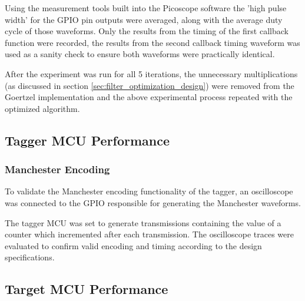 Using the measurement tools built into the Picoscope software the 'high pulse width' for the GPIO pin outputs were averaged, along with the average duty cycle of those waveforms. Only the results from the timing of the first callback function were recorded, the results from the second callback timing waveform was used as a sanity check to ensure both waveforms were practically identical.


After the experiment was run for all 5 iterations, the unnecessary multiplications (as discussed in section \ref{sec:filter_optimization_design}) were removed from the Goertzel implementation and the above experimental process repeated with the optimized algorithm.







\subsection{Tagger MCU Performance}

\subsubsection{Manchester Encoding}
To validate the Manchester encoding functionality of the tagger, an oscilloscope was connected to the GPIO responsible for generating the Manchester waveforms.

The tagger MCU was set to generate transmissions containing the value of a counter which incremented after each transmission. The oscilloscope traces were evaluated to confirm valid encoding and timing according to the design specifications.




\subsection{Target MCU Performance}

